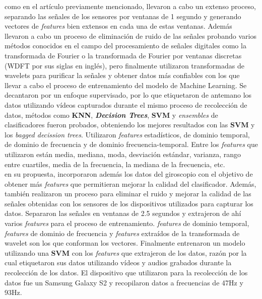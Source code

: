 \cite{el2018towards} como en el artículo previamente mencionado, llevaron a cabo un extenso proceso, separando las señales de los sensores por
ventanas de 1 segundo y generando vectores de \emph{features} bien extensos en cada una de estas ventanas. Además llevaron a cabo un proceso de eliminación de ruido
de las señales probando varios métodos conocidos en el campo del procesamiento de señales digitales como la transformada de Fourier o la transformada de
Fourier por ventanas discretas (WDFT por sus siglas en inglés), pero finalmente utilizaron transformadas de wavelets para purificar la señales y obtener
datos más confiables con los que llevar a cabo el proceso de entrenamiento del modelo de Machine Learning. Se decantaron por un enfoque supervisado, por lo que
etiquetaron de antemano los datos utilizando vídeos capturados durante el mismo proceso de recolección de datos, métodos como \textbf{KNN},
\emph{\textbf{Decision Trees}}, \textbf{SVM} y \emph{ensembles} de clasificadores fueron probados, obteniendo los mejores resultados con las \textbf{SVM} y los
\emph{bagged decission trees}. Utilizaron \emph{features} estadísticos, de dominio temporal, de dominio de frecuencia y de dominio frecuencia-temporal. Entre los \emph{features}
que utilizaron están media, mediana, moda, desviación estándar, varianza, rango entre cuartiles, media de la frecuencia, la mediana de la frecuencia, etc.\\

\cite{seraj2015roads} en su propuesta, incorporaron además los datos del giroscopio con el objetivo de obtener más \emph{features} que permitieran mejorar la calidad
del clasificador. Además, también realizaron un proceso para eliminar el ruido y mejorar la calidad de las señales obtenidas con los sensores de los dispositivos
utilizados para capturar los datos. Separaron las señales en ventanas de 2.5 segundos y extrajeron de ahí varios \emph{features} para el proceso de entrenamiento. \emph{features}
de dominio temporal, \emph{features} de dominio de frecuencia y \emph{features} extraídos de la transformada de wavelet son los que conforman los vectores. Finalmente entrenaron
un modelo utilizando una \textbf{SVM} con los \emph{features} que extrajeron de los datos, razón por la cual etiquetaron sus datos utilizando vídeos y audios grabados durante la
recolección de los datos. El dispositivo que utilizaron para la recolección de los datos fue un Samsung Galaxy S2 y recopilaron datos a frecuencias de 47Hz y 93Hz.\\

